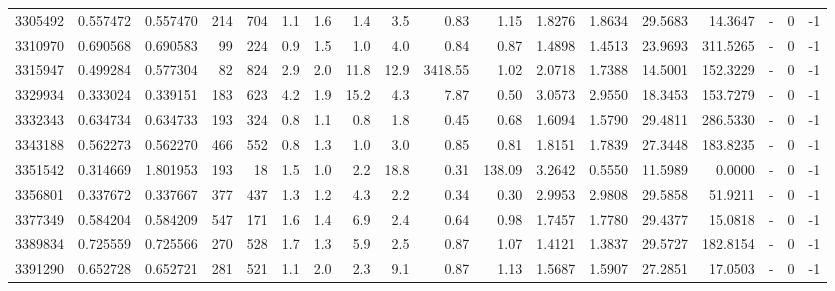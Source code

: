 \begin{tabular}{rrrrrrrrrrrrrrrlrr}
   3305492 & 0.557472 &   0.557470 &  214 &  704 &      1.1 &      1.6 &     1.4 &      3.5 &       0.83 &        1.15 &  1.8276 &  1.8634 &   29.5683 &   14.3647 &             - &        0 &         -1 \\
   3310970 & 0.690568 &   0.690583 &   99 &  224 &      0.9 &      1.5 &     1.0 &      4.0 &       0.84 &        0.87 &  1.4898 &  1.4513 &   23.9693 &  311.5265 &             - &        0 &         -1 \\
   3315947 & 0.499284 &   0.577304 &   82 &  824 &      2.9 &      2.0 &    11.8 &     12.9 &    3418.55 &        1.02 &  2.0718 &  1.7388 &   14.5001 &  152.3229 &             - &        0 &         -1 \\
   3329934 & 0.333024 &   0.339151 &  183 &  623 &      4.2 &      1.9 &    15.2 &      4.3 &       7.87 &        0.50 &  3.0573 &  2.9550 &   18.3453 &  153.7279 &             - &        0 &         -1 \\
   3332343 & 0.634734 &   0.634733 &  193 &  324 &      0.8 &      1.1 &     0.8 &      1.8 &       0.45 &        0.68 &  1.6094 &  1.5790 &   29.4811 &  286.5330 &             - &        0 &         -1 \\
   3343188 & 0.562273 &   0.562270 &  466 &  552 &      0.8 &      1.3 &     1.0 &      3.0 &       0.85 &        0.81 &  1.8151 &  1.7839 &   27.3448 &  183.8235 &             - &        0 &         -1 \\
   3351542 & 0.314669 &   1.801953 &  193 &   18 &      1.5 &      1.0 &     2.2 &     18.8 &       0.31 &      138.09 &  3.2642 &  0.5550 &   11.5989 &    0.0000 &             - &        0 &         -1 \\
   3356801 & 0.337672 &   0.337667 &  377 &  437 &      1.3 &      1.2 &     4.3 &      2.2 &       0.34 &        0.30 &  2.9953 &  2.9808 &   29.5858 &   51.9211 &             - &        0 &         -1 \\
   3377349 & 0.584204 &   0.584209 &  547 &  171 &      1.6 &      1.4 &     6.9 &      2.4 &       0.64 &        0.98 &  1.7457 &  1.7780 &   29.4377 &   15.0818 &             - &        0 &         -1 \\
   3389834 & 0.725559 &   0.725566 &  270 &  528 &      1.7 &      1.3 &     5.9 &      2.5 &       0.87 &        1.07 &  1.4121 &  1.3837 &   29.5727 &  182.8154 &             - &        0 &         -1 \\
   3391290 & 0.652728 &   0.652721 &  281 &  521 &      1.1 &      2.0 &     2.3 &      9.1 &       0.87 &        1.13 &  1.5687 &  1.5907 &   27.2851 &   17.0503 &             - &        0 &         -1 \\

\end{tabular}
